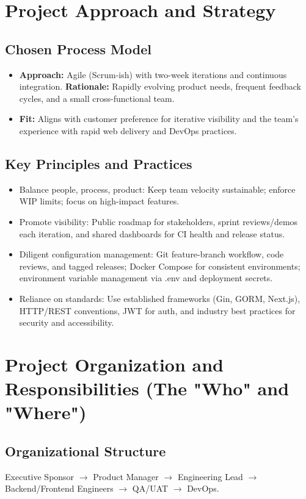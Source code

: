 \documentclass[12pt,a4paper]{article}
\begin{document}
\section{Project Approach and Strategy}

\subsection{Chosen Process Model}
\begin{itemize}
\item \textbf{Approach:} Agile (Scrum-ish) with two-week iterations and continuous integration. \textbf{Rationale:} Rapidly evolving product needs, frequent feedback cycles, and a small cross-functional team.
\item \textbf{Fit:} Aligns with customer preference for iterative visibility and the team's experience with rapid web delivery and DevOps practices.
\end{itemize}

\subsection{Key Principles and Practices}
\begin{itemize}
\item Balance people, process, product: Keep team velocity sustainable; enforce WIP limits; focus on high-impact features.
\item Promote visibility: Public roadmap for stakeholders, sprint reviews/demos each iteration, and shared dashboards for CI health and release status.
\item Diligent configuration management: Git feature-branch workflow, code reviews, and tagged releases; Docker Compose for consistent environments; environment variable management via .env and deployment secrets.
\item Reliance on standards: Use established frameworks (Gin, GORM, Next.js), HTTP/REST conventions, JWT for auth, and industry best practices for security and accessibility.
\end{itemize}

\section{Project Organization and Responsibilities (The "Who" and "Where")}

\subsection{Organizational Structure}
Executive Sponsor $\rightarrow$ Product Manager $\rightarrow$ Engineering Lead $\rightarrow$ Backend/Frontend Engineers $\rightarrow$ QA/UAT $\rightarrow$ DevOps.
\end{document}
